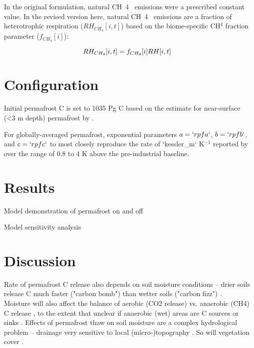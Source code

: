 \documentclass[essd, manuscript]{copernicus}
\begin{document}
In the original formulation, natural CH~4~ emissions were a prescribed constant value.
In the revised version here, natural CH~4~ emissions are a fraction of heterotrophic respiration ($RH_{CH_4}[i,t]$) based on the biome-specific CH$^4$ fraction parameter ($f_{CH_4}[i]$):

\begin{equation*}
    RH_{CH_4}[i,t] = f_{CH_4}[i] RH[i,t] \\
\end{equation*}

\section{Configuration}
Initial permafrost C is set to 1035 Pg C based on the estimate for near-surface (<3 m depth) permafrost by \citet{hugelius_2014_estimated}.


For globally-averaged permafrost, exponential parameters $a = `r pfa`$, $b = `r pfb`$, and $c = `r pfc`$ to most closely reproduce the rate of `kessler_m` K$^{-1}$ reported by \citet{kessler_2017_estimating} over the range of 0.8 \footnotemark to 4 K above the pre-industrial baseline.


\section{Results}
Model demonstration of permafrost on and off

Model sensitivity analysis

\section{Discussion}
Rate of permafrost C release also depends on soil moisture conditions -- drier soils release C much faster ("carbon bomb") than wetter soils ("carbon fizz") \citep{elberling_2013_long}.
Moisture will also affect the balance of aerobic (CO2 release) vs. anaerobic (CH4) C release \citep{turetsky_2002_boreal}, to the extent that unclear if anaerobic (wet) areas are C sources or sinks \citep{wickland_2006_effects}.
Effects of permafrost thaw on soil moisture are a complex hydrological problem -- drainage very sensitive to local (micro-)topography \citep{wickland_2006_effects}.
So will vegetation cover \citep{wickland_2006_effects}.
\end{document}
